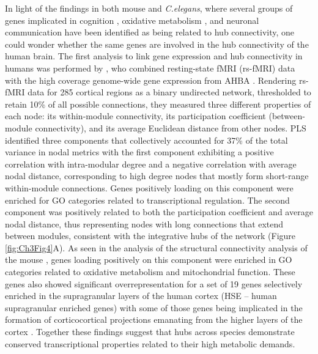 In light of the findings in both mouse and \textit{C.elegans}, where several groups of genes implicated in cognition \citep{Rubinov2015c}, oxidative metabolism \citep{Fulcher2016}, and neuronal communication \citep{Arnatkeviciute2018} have been identified as being related to hub connectivity, one could wonder whether the same genes are involved in the hub connectivity of the human brain. The first analysis to link gene expression and hub connectivity in humans was performed by \citet{Vertes2016b}, who combined resting-state fMRI (rs-fMRI) data with the high coverage genome-wide gene expression from AHBA \citep{Hawrylycz2012}.
Rendering rs-fMRI data for 285 cortical regions as a binary undirected network, thresholded to retain 10\% of all possible connections, they measured three different properties of each node: its within-module connectivity, its participation coefficient (between-module connectivity), and its average Euclidean distance from other nodes.
PLS identified three components that collectively accounted for 37\% of the total variance in nodal metrics with the first component exhibiting a positive correlation with intra-modular degree and a negative correlation with average nodal distance, corresponding to high degree nodes that mostly form short-range within-module connections. Genes positively loading on this component were enriched for GO categories related to transcriptional regulation. The second component was positively related to both the participation coefficient and average nodal distance, thus representing nodes with long connections that extend between modules, consistent with the integrative hubs of the network (Figure \ref{fig:Ch3Fig4}A).
As seen in the analysis of the structural connectivity analysis of the mouse \citep{Fulcher2016}, genes loading positively on this component were enriched in GO categories related to oxidative metabolism and mitochondrial function.
These genes also showed significant overrepresentation for a set of 19 genes \citep{Krienen2016} selectively enriched in the supragranular layers of the human cortex (HSE – human supragranular enriched genes) with some of those genes being implicated in the formation of corticocortical projections emanating from the higher layers of the cortex \citep{Krienen2016}.
Together these findings suggest that hubs across species demonstrate conserved transcriptional properties related to their high metabolic demands.

